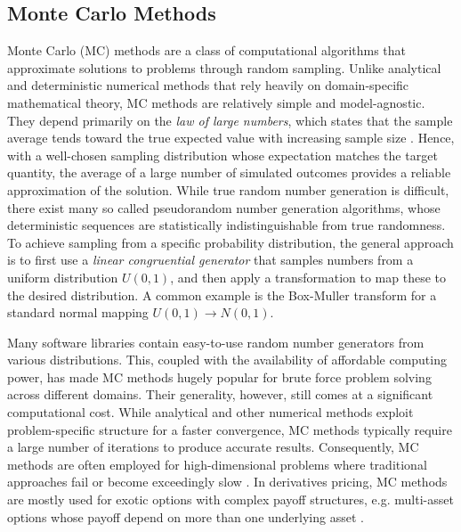 \documentclass[english,12pt,a4paper,pdftex,sci,utf8]{aaltothesis}
\begin{document}
\subsection{Monte Carlo Methods}
Monte Carlo (MC) methods are a class of computational algorithms that approximate solutions to problems through random sampling. Unlike analytical and deterministic numerical methods that rely heavily on domain-specific mathematical theory, MC methods are relatively simple and model-agnostic. They depend primarily on the \emph{law of large numbers}, which states that the sample average tends toward the true expected value with increasing sample size \cite{Ross2020prob}. Hence, with a well-chosen sampling distribution whose expectation matches the target quantity, the average of a large number of simulated outcomes provides a reliable approximation of the solution. While true random number generation is difficult, there exist many so called pseudorandom number generation algorithms, whose deterministic sequences are statistically indistinguishable from true randomness. To achieve sampling from a specific probability distribution, the general approach is to first use a \emph{linear congruential generator} that samples numbers from a uniform distribution $U(0,1)$, and then apply a transformation to map these to the desired distribution. A common example is the Box-Muller transform for a standard normal mapping $U(0,1) \rightarrow N(0,1)$. \cite{gentle2003random}

Many software libraries contain easy-to-use random number generators from various distributions. This, coupled with the availability of affordable computing power, has made MC methods hugely popular for brute force problem solving across different domains. Their generality, however, still comes at a significant computational cost. While analytical and other numerical methods exploit problem-specific structure for a faster convergence, MC methods typically require a large number of iterations to produce accurate results. Consequently, MC methods are often employed for high-dimensional problems where traditional approaches fail or become exceedingly slow \cite{gentle2003random}. In derivatives pricing, MC methods are mostly used for exotic options with complex payoff structures, e.g. multi-asset options whose payoff depend on more than one underlying asset \cite{hull2016options,wilmott2013paul}.
\end{document}

